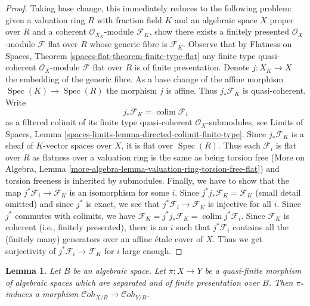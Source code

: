 \documentclass{stacks-project}
\theoremstyle{plain}
\newtheorem{lemma}[subsection]{Lemma}
\theoremstyle{definition}
\theoremstyle{remark}
\numberwithin{equation}{subsection}
\def\colim{\mathop{\mathrm{colim}}\nolimits}
\def\Spec{\mathop{\mathrm{Spec}}}
\def\Cohstack{\mathcal{C}\!\mathit{oh}}
\begin{document}
\begin{proof}
Taking base change, this immediately reduces to the following
problem: given a valuation ring $R$ with fraction field $K$ and
an algebraic space $X$ proper over $R$ and a coherent
$\mathcal{O}_{X_K}$-module $\mathcal{F}_K$, show there exists
a finitely presented $\mathcal{O}_X$-module $\mathcal{F}$
flat over $R$ whose generic fibre is $\mathcal{F}_K$.
Observe that by Flatness on Spaces, Theorem
\ref{spaces-flat-theorem-finite-type-flat}
any finite type quasi-coherent $\mathcal{O}_X$-module
$\mathcal{F}$ flat over $R$ is of finite presentation.
Denote $j : X_K \to X$ the embedding of the generic fibre.
As a base change of the affine morphism $\Spec(K) \to \Spec(R)$
the morphism $j$ is affine. Thus $j_*\mathcal{F}_K$ is
quasi-coherent. Write
$$
j_*\mathcal{F}_K = \colim \mathcal{F}_i
$$
as a filtered colimit of its finite type quasi-coherent
$\mathcal{O}_X$-submodules, see
Limits of Spaces, Lemma \ref{spaces-limits-lemma-directed-colimit-finite-type}.
Since $j_*\mathcal{F}_K$ is a sheaf of $K$-vector spaces over $X$,
it is flat over $\Spec(R)$. Thus each $\mathcal{F}_i$ is flat
over $R$ as flatness over a valuation ring is the same as being
torsion free
(More on Algebra, Lemma
\ref{more-algebra-lemma-valuation-ring-torsion-free-flat})
and torsion freeness is inherited by submodules.
Finally, we have to show that the map
$j^*\mathcal{F}_i \to \mathcal{F}_K$
is an isomorphism for some $i$.
Since $j^*j_*\mathcal{F}_K = \mathcal{F}_K$ (small detail omitted)
and since $j^*$ is exact, we see that $j^*\mathcal{F}_i \to \mathcal{F}_K$
is injective for all $i$.
Since $j^*$ commutes with colimits, we have
$\mathcal{F}_K = j^*j_*\mathcal{F}_K = \colim j^*\mathcal{F}_i$.
Since $\mathcal{F}_K$ is coherent (i.e., finitely presented),
there is an $i$ such that $j^*\mathcal{F}_i$ contains all the
(finitely many) generators over an affine \'etale cover of $X$.
Thus we get surjectivity of $j^*\mathcal{F}_i \to \mathcal{F}_K$
for $i$ large enough.
\end{proof}

\begin{lemma}
\label{lemma-coherent-functorial}
Let $B$ be an algebraic space. Let $\pi : X \to Y$ be a quasi-finite
morphism of algebraic spaces which are separated and of finite presentation
over $B$. Then $\pi_*$ induces a morphism
$\Cohstack_{X/B} \to \Cohstack_{Y/B}$.
\end{lemma}
\end{document}
